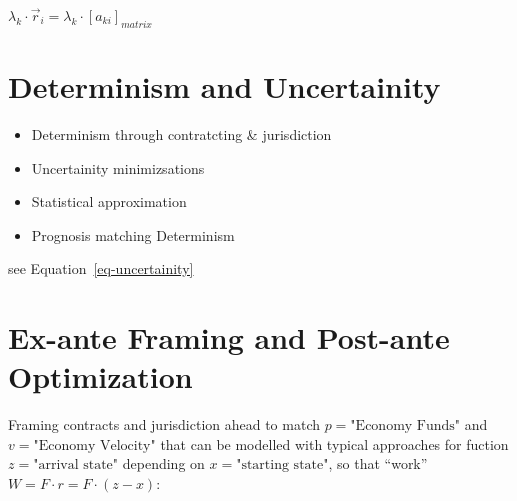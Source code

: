 \documentclass[
  letterpaper,
  DIV=11,
  numbers=noendperiod]{scrartcl}
\providecommand{\tightlist}{%
  \setlength{\itemsep}{0pt}\setlength{\parskip}{0pt}}
\begin{document}
\(\lambda_k \cdot \vec r_i = \lambda_k \cdot \left[ a_{ki} \right]_{matrix}\)

\hfill\break
\hfill\break

\section{Determinism and Uncertainity}\label{sec-determinism}

\begin{itemize}
\tightlist
\item
  Determinism through contratcting \& jurisdiction
\item
  Uncertainity minimizsations
\item
  Statistical approximation
\item
  Prognosis matching Determinism
\end{itemize}

see Equation~\ref{eq-uncertainity}

\hfill\break
\hfill\break

\section{Ex-ante Framing and Post-ante
Optimization}\label{sec-optimization}

Framing contracts and jurisdiction ahead to match
\(p = \text{"Economy Funds"}\) and \(v = \text{"Economy Velocity"}\)
that can be modelled with typical approaches for fuction
\(z = \text{"arrival state"}\) depending on
\(x = \text{"starting state"}\), so that ``work''
\(W = F \cdot r =  F \cdot (z - x)\):
\end{document}
